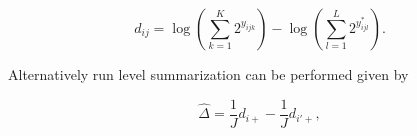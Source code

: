\documentclass{mcp}
\def\secref#1{Section~\ref{#1}}
\begin{document}
\[
d_{ij} = \log \left( \sum_{k=1}^{K} 2^{y_{ijk}} \right) - \log \left( \sum_{l=1}^{L} 2^{y_{ijl}^{\ast}} \right).
\]

Alternatively run level summarization can be performed given by

\[
\hat{\Delta} = \frac{1}{J} d_{i+} - \frac{1}{J} d_{i'+},
\]


%
%
%
%
\end{document}
